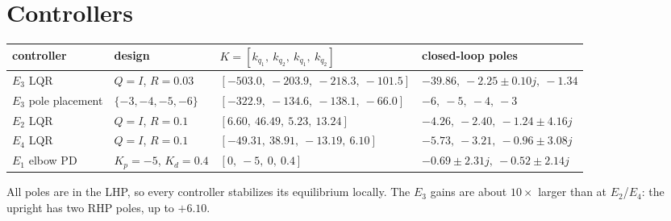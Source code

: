 \documentclass[10pt,letterpaper]{article}
\newenvironment{keep}{\par\noindent\begin{minipage}{\linewidth}}{\end{minipage}\par\smallskip}
\begin{document}
\begin{keep}
\section{Controllers}
\begin{center}
\label{tab:ctrl}
\footnotesize\setlength{\tabcolsep}{5pt}\renewcommand{\arraystretch}{1.0}
\begin{tabular}{@{}llll@{}}
\toprule
controller & design & $K=[k_{q_1},\ k_{q_2},\ k_{\dot q_1},\ k_{\dot q_2}]$ & closed-loop poles\\
\midrule
$E_3$ LQR & $Q=I$, $R=0.03$ & $[-503.0,\ -203.9,\ -218.3,\ -101.5]$ & $-39.86,\ -2.25\pm0.10j,\ -1.34$\\
$E_3$ pole placement & $\{-3,-4,-5,-6\}$ & $[-322.9,\ -134.6,\ -138.1,\ -66.0]$ & $-6,\ -5,\ -4,\ -3$\\
$E_2$ LQR & $Q=I$, $R=0.1$ & $[6.60,\ 46.49,\ 5.23,\ 13.24]$ & $-4.26,\ -2.40,\ -1.24\pm4.16j$\\
$E_4$ LQR & $Q=I$, $R=0.1$ & $[-49.31,\ 38.91,\ -13.19,\ 6.10]$ & $-5.73,\ -3.21,\ -0.96\pm3.08j$\\
$E_1$ elbow PD & $K_p=-5$, $K_d=0.4$ & $[0,\ -5,\ 0,\ 0.4]$ & $-0.69\pm2.31j,\ -0.52\pm2.14j$\\
\bottomrule
\end{tabular}
\end{center}
All poles are in the LHP, so every controller stabilizes its equilibrium locally. The $E_3$ gains are about $10\times$ larger than at $E_2$/$E_4$: the upright has two RHP poles, up to $+6.10$.
\end{keep}
\end{document}
